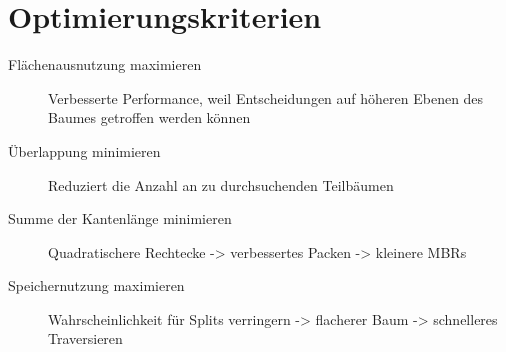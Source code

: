 \documentclass[14pt,a5paper,landscape]{handout}
\begin{document}


\section{Optimierungskriterien} %
\label{sec:optimierungskriterien}

\begin{description}
	\item[Flächenausnutzung maximieren] Verbesserte Performance, weil Entscheidungen auf höheren Ebenen des Baumes getroffen werden können
	\item[Überlappung minimieren] Reduziert die Anzahl an zu durchsuchenden Teilbäumen
	\item[Summe der Kantenlänge minimieren] Quadratischere Rechtecke -> verbessertes Packen -> kleinere MBRs
	\item[Speichernutzung maximieren] Wahrscheinlichkeit für Splits verringern -> flacherer Baum -> schnelleres Traversieren
\end{description}

\end{document}

